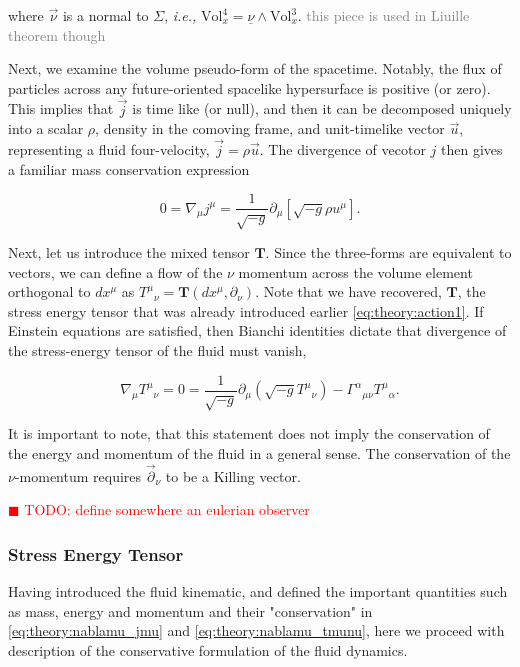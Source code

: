 \documentclass[11pt,a4paper,headinclude=true,DIV=14,BCOR=8mm,chapterprefix,listof=totoc,twoside,openright,abstracton]{scrbook}
\newcommand{\todo}[1]{\textcolor{red}{$\blacksquare$ TODO: #1}}
\begin{document}
where $\vec{\nu}$ is a normal to $\Sigma$, \textit{i.e.,} $\text{Vol}^4 _x = \underline{\nu}\wedge\text{Vol}^3 _x$.
\textcolor{gray}{this piece is used in Liuille theorem though}

Next, we examine the volume pseudo-form of the spacetime. Notably, the flux of particles  across any future-oriented spacelike hypersurface is positive (or zero). This implies that $\vec{j}$ is time like (or null), and then it can be decomposed uniquely into a scalar $\rho$, density in the comoving frame, and unit-timelike vector $\vec{u}$, representing a fluid four-velocity, $\vec{j} = \rho \vec{u}$. The divergence of vecotor $j$ then gives a familiar mass conservation expression

\begin{equation}
0 = \nabla_{\mu}j^{\mu} = \frac{1}{\sqrt{-g}}\partial_{\mu}[\sqrt{-g}\rho u^{\mu}].
\label{eq:theory:nablamu_jmu}
\end{equation}

Next, let us introduce the mixed tensor $\boldsymbol{T}$. Since the three-forms are equivalent to vectors, we can define a flow of the $\nu$ momentum across the volume element orthogonal to $dx^{\mu}$ as ${T^{\mu}}_{\nu}=\boldsymbol{T}(dx^{\mu},\partial_{\nu})$. Note that we have recovered, $\boldsymbol{T}$, the stress energy tensor that was already introduced earlier \ref{eq:theory:action1}. If Einstein equations are satisfied, then Bianchi identities dictate that divergence of the stress-energy tensor of the fluid must vanish, 

\begin{equation}
\nabla_{\mu}{T^{\mu}}_{\nu} = 0= \frac{1}{\sqrt{-g}}\partial_{\mu}(\sqrt{-g}{T^{\mu}}_{\nu}) - {\Gamma^{\alpha}}_{\mu\nu}{T^{\mu}}_{\alpha}.
\label{eq:theory:nablamu_tmunu}
\end{equation}

It is important to note, that this statement does not imply the conservation of the energy and momentum of the fluid in a general sense. The conservation of the $\nu$-momentum requires $\vec{\partial}_{\nu}$ to be a Killing vector.

\todo{define somewhere an eulerian observer}


\subsubsection{Stress Energy Tensor}

Having introduced the fluid kinematic, and defined the important quantities such as mass, energy and momentum and their "conservation" in \ref{eq:theory:nablamu_jmu} and \ref{eq:theory:nablamu_tmunu}, here we proceed with description of the conservative formulation of the fluid dynamics. 
\end{document}
